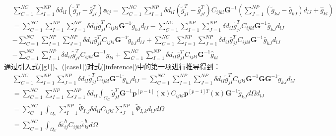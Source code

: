 \begin{equation}\label{inference}
\begin{split}
    &\sum_{C=1}^{N\!C}\sum_{I=1}^{N\!P}\delta d_{iI}(\tilde{g}_{jI}^T-\bar{g}_{jI}^T)\pmb{a}_{ij}=\sum_{C=1}^{N\!C}\sum_{I=1}^{N\!P}\delta d_{iI}(\tilde{g}_{jI}^T-\bar{g}_{jI}^T)C_{ijkl}\pmb{G}^{-1}(\sum_{J=1}^{N\!P}(\tilde{g}_{kJ}-\bar{g}_{kJ})d_{lJ}+\hat{g}_{kl})\\
    &=\sum_{C=1}^{N\!C}\sum_{I=1}^{N\!P}\sum_{J=1}^{N\!P}\delta d_{iI}\tilde{g}^T_{jI}C_{ijkl}\pmb{G}^{-1}\tilde{g}_{kJ}d_{lJ}
    -\sum_{C=1}^{N\!C}\sum_{I=1}^{N\!P}\sum_{J=1}^{N\!P}\delta d_{iI}\tilde{g}^T_{jI}C_{ijkl}\pmb{G}^{-1}\bar{g}_{kJ}d_{lJ}\\
    &-\sum_{C=1}^{N\!C}\sum_{I=1}^{N\!P}\sum_{J=1}^{N\!P}\delta d_{iI}\bar{g}^T_{jI}C_{ijkl}\pmb{G}^{-1}\tilde{g}_{kJ}d_{lJ}
    +\sum_{C=1}^{N\!C}\sum_{I=1}^{N\!P}\sum_{J=1}^{N\!P}\delta d_{iI}\bar{g}^T_{jI}C_{ijkl}\pmb{G}^{-1}\bar{g}_{kJ}d_{lJ}\\
    &-\sum_{C=1}^{N\!C}\sum_{I=1}^{N\!P}\delta d_{iI}\tilde{g}_{jI}^TC_{ijkl}\pmb{G}^{-1}\hat{g}_{kl}
    +\sum_{C=1}^{N\!C}\sum_{I=1}^{N\!P}\delta d_{iI}\bar{g}_{jI}^TC_{ijkl}\pmb{G}^{-1}\hat{g}_{kl}
\end{split}
\end{equation}
通过引入式(\ref{g1})、(\ref{case1})对式(\ref{inference})中的第一项进行推导得到：
\begin{equation}\label{CH4-K}
\begin{split}
    &\sum_{C=1}^{N\!C}\sum_{I=1}^{N\!P}\sum_{J=1}^{N\!P}\delta d_{iI}\tilde{g}^T_{jI}C_{ijkl}\pmb{G}^{-1}\tilde{g}_{kJ}d_{lJ}=\sum_{C=1}^{N\!C}\sum_{I=1}^{N\!P}\sum_{J=1}^{N\!P}\delta d_{iI}\tilde{g}^T_{jI}C_{ijkl}\pmb{G}^{-1}\pmb{G}\pmb{G}^{-1}\tilde{g}_{kJ}d_{lJ}\\
&=\sum_{C=1}^{N\!C}\sum_{I=1}^{N\!P}\sum_{J=1}^{N\!P}\delta d_{iI}\int_{\Omega_C}\tilde{g}_{jI}^T\pmb{G}^{-1}\pmb{p}^{[p-1]}(\pmb x)C_{ijkl}\pmb{p}^{[p-1]T}(\pmb{x})\pmb{G}^{-1}\tilde{g}_{kJ}d\Omega d_{lJ}\\
&=\sum_{C=1}^{N\!C}\int_{\Omega_C}\sum_{I=1}^{N\!P}\tilde{\Psi}_{I,j}\delta d_{iI}C_{ijkl}\sum_{J=1}^{N\!P}\tilde{\Psi}_{I,k}d_{lJ}d\Omega\\
&=\sum_{C=1}^{N\!C}\int_{\Omega_C}\delta\tilde{\varepsilon}_{ij}^hC_{ijkl}\tilde{\varepsilon}_{kl}^hd\Omega\\
\end{split}
\end{equation}
